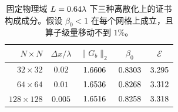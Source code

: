 \documentclass[UTF8,a4paper,11pt]{ctexart}
\newcommand{\norm}[1]{\lVert #1 \rVert}
\newcommand{\numv}[1]{#1}
\begin{document}
\begin{table}[htbp]
\centering
\caption{固定物理域 $L=\numv{\NumGridL}\lambda$ 下三种离散化上的证书构成成分。假设 $\beta_0<1$ 在每个网格上成立，且算子级量移动不到 $1\%$。}
\label{tab:grid}
\small
\begin{tabular}{rcccc}
\toprule
$N\times N$ & $\Delta x/\lambda$ & $\norm{G_b}_2$ & $\beta_0$ & $\mathcal{E}$ \\
\midrule
$32\times32$   & $0.02$  & $\numv{\NumGridGbLo}$  & $\numv{\NumGridBetaLo}$  & $\numv{\NumGridELo}$ \\
$64\times64$   & $0.01$  & $\numv{\NumGridGbMd}$  & $\numv{\NumGridBetaMd}$  & $\numv{\NumGridEMd}$ \\
$128\times128$ & $0.005$ & $\numv{\NumGridGbHi}$ & $\numv{\NumGridBetaHi}$ & $\numv{\NumGridEHi}$ \\
\bottomrule
\end{tabular}
\end{table}
\end{document}

